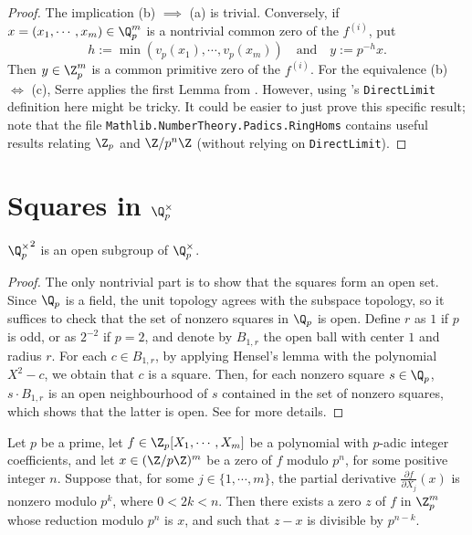 \begin{proof}
The implication (b) $ \implies$ (a) is trivial. Conversely, if $x = (x_1, \cdots, x_m) \in \Q_p^m$ is a nontrivial common zero of the $f^{(i)}$, put
\[ h := \min(v_p(x_1), \cdots, v_p(x_m)) \quad \text{and} \quad y := p^{-h} x. \]
Then $y \in \Z_p^m$ is a common primitive zero of the $f^{(i)}$.
For the equivalence (b) $\iff$ (c), Serre applies the first Lemma from \cite[\S II.2.1]{Ser73}. However, using \mathlib's \texttt{DirectLimit} definition here might be tricky. It could be easier to just prove this specific result; note that the file \texttt{Mathlib.NumberTheory.Padics.RingHoms} contains useful results relating $\Z_p$ and $\Z/p^n\Z$ (without relying on \texttt{DirectLimit}).

\end{proof}

\section[Squares in the p-adic units]{Squares in $\Q_p^{\times}$}\label{sec:padic_squares}

\begin{theorem}\label{thm:padic_squares_open}
\leanok
${\Q_p^\times}^2$ is an open subgroup of $\Q_p^\times$.
\end{theorem}

\begin{proof}
\leanok
The only nontrivial part is to show that the squares form an open set.  Since $\Q_p$ is a field, the unit topology agrees with the subspace topology, so it suffices to check that the set of nonzero squares in $\Q_p$ is open. Define $r$ as $1$ if $p$ is odd, or as $2^{-2}$ if $p = 2$, and denote by $B_{1, r}$ the open ball with center $1$ and radius $r$. For each $c \in B_{1, r}$, by applying Hensel's lemma with the polynomial $X^2 - c$, we obtain that $c$ is a square.
Then, for each nonzero square $s \in \Q_p$, $s \cdot B_{1, r}$ is an open neighbourhood of $s$ contained in the set of nonzero squares, which shows that the latter is open.
See \cite[\S II.3.3]{Ser73} for more details.
\end{proof}

\begin{lemma}
  \label{lem:multivariable_hensel}
  \leanok
Let $p$ be a prime, let $f \in \Z_p[X_1, \cdots, X_m]$ be a polynomial with $p$-adic integer
coefficients, and let $x \in (\Z/p\Z)^m$ be a zero of $f$ modulo $p^n$, for some positive integer
$n$. Suppose that, for some $j \in \{1, \cdots, m\}$, the partial derivative
$\frac{\partial f}{\partial X_j}(x)$ is nonzero modulo $p^k$, where $0 < 2k < n$.
Then there exists a zero $z$ of $f$ in $\Z_p^m$ whose reduction modulo $p^n$ is $x$, and such that
$z-x$ is divisible by $p^{n-k}$.
\end{lemma}

